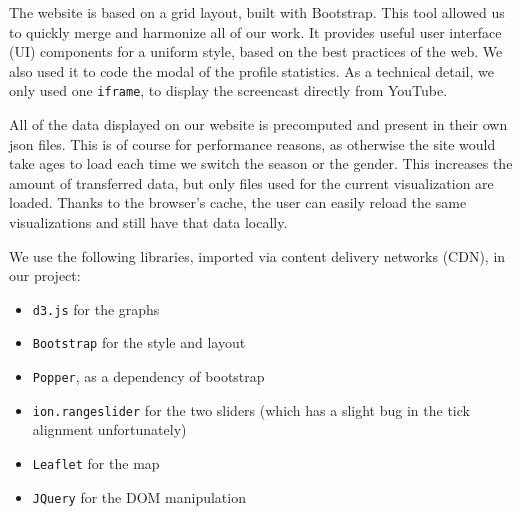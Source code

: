 The website is based on a grid layout, built with Bootstrap.
This tool allowed us to quickly merge and harmonize all of our work.
It provides useful user interface (UI) components for a uniform style, based on the best practices of the web.
We also used it to code the modal of the profile statistics.
As a technical detail, we only used one \texttt{iframe}, to display the screencast directly from YouTube.

All of the data displayed on our website is precomputed and present in their own json files.
This is of course for performance reasons, as otherwise the site would take ages to load each time we switch the season or the gender.
This increases the amount of transferred data, but only files used for the current visualization are loaded.
Thanks to the browser's cache, the user can easily reload the same visualizations and still have that data locally.

We use the following libraries, imported via content delivery networks (CDN), in our project:

\begin{itemize}
    \item \texttt{d3.js} for the graphs
    \item \texttt{Bootstrap} for the style and layout
    \item \texttt{Popper}, as a dependency of bootstrap
    \item \texttt{ion.rangeslider} for the two sliders (which has a slight bug in the tick alignment unfortunately)
    \item \texttt{Leaflet} for the map
    \item \texttt{JQuery} for the DOM manipulation
\end{itemize}

